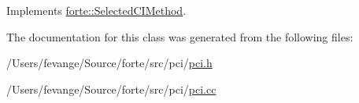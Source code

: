 Implements \mbox{\hyperlink{classforte_1_1_selected_c_i_method_ad03bbde3a0443ca9b01ff9605f2e06e0}{forte\+::\+Selected\+C\+I\+Method}}.



The documentation for this class was generated from the following files\+:\begin{DoxyCompactItemize}
\item 
/\+Users/fevange/\+Source/forte/src/pci/\mbox{\hyperlink{pci_8h}{pci.\+h}}\item 
/\+Users/fevange/\+Source/forte/src/pci/\mbox{\hyperlink{pci_8cc}{pci.\+cc}}\end{DoxyCompactItemize}
